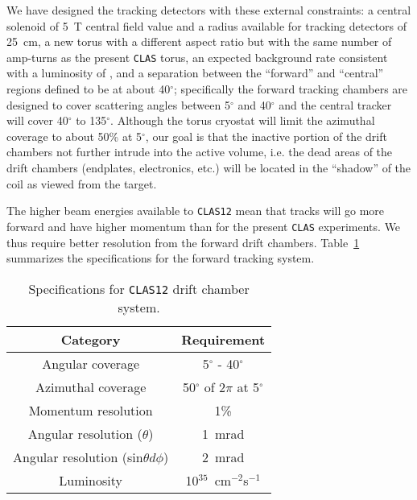We have designed the tracking detectors with these external constraints: 
a central solenoid of 5~T central field value and a radius available for 
tracking detectors of 25~cm, a new torus with a different aspect ratio 
but with the same number of amp-turns as the present {\tt CLAS} torus, 
an expected background rate consistent with a luminosity of , and a 
separation between the ``forward'' and ``central'' regions defined to be 
at about 40$^{\circ}$; specifically the forward tracking chambers are 
designed to cover scattering angles between 5$^{\circ}$ and 40$^{\circ}$ 
and the central tracker will cover 40$^{\circ}$ to 135$^{\circ}$.  Although 
the torus cryostat will limit the azimuthal coverage to about 50\% at 
5$^{\circ}$, our goal is that the inactive portion of the drift chambers 
not further intrude into the active volume, i.e. the dead areas of the drift 
chambers (endplates, electronics, etc.) will be located in the ``shadow'' 
of the coil as viewed from the target. 

The higher beam energies available to {\tt CLAS12} mean that tracks will 
go more forward and have higher momentum than for the present {\tt CLAS} 
experiments.  We thus require better resolution from the forward drift 
chambers.  Table~\ref{dc-specs} summarizes the specifications for the
forward tracking system.

\begin{table}[htbp]
\begin{center}
\begin{tabular} {||c|c||} \hline \hline
{\bf Category}      & {\bf Requirement} \\ \hline
Angular coverage    & 5$^{\circ}$ - 40$^{\circ}$ \\ \hline
Azimuthal coverage & 50$^{\circ}$ of 2$\pi$ at 5$^{\circ}$ \\ \hline
Momentum resolution & 1\%         \\ \hline
Angular resolution ($\theta$)  & 1~mrad  \\ \hline
Angular resolution (sin$\theta d\phi$)  & 2~mrad  \\ \hline
Luminosity     &  10$^{35}$~cm$^{-2}$s$^{-1}$ \\ \hline
\end{tabular}
\caption{\small{Specifications for {\tt CLAS12} drift chamber system.}}
\label{dc-specs}
\end{center}
\end{table}

